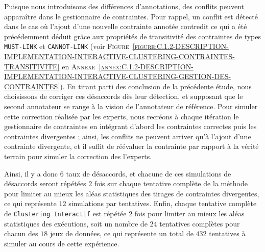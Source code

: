 			Puisque nous introduisons des différences d'annotations, des conflits peuvent apparaître dans le gestionnaire de contraintes.
			Pour rappel, un conflit est détecté dans le cas où l'ajout d'une nouvelle contrainte annotée contredit ce qui a été précédemment déduit grâce aux propriétés de transitivité des contraintes de types \texttt{MUST-LINK} et \texttt{CANNOT-LINK} (voir \textsc{Figure~\ref{figure:C.1.2-DESCRIPTION-IMPLEMENTATION-INTERACTIVE-CLUSTERING-CONTRAINTES-TRANSITIVITE}} en \textsc{Annexe~\ref{annex:C.1.2-DESCRIPTION-IMPLEMENTATION-INTERACTIVE-CLUSTERING-GESTION-DES-CONTRAINTES}}).
			En tirant parti des conclusion de la précédente étude, nous choisissons de corriger ces désaccords dès leur détection, et supposant que le second annotateur se range à la vision de l'annotateur de référence.
			Pour simuler cette correction réalisée par les experts, nous recréons à chaque itération le gestionnaire de contraintes en intégrant d'abord les contraintes correctes puis les contraintes divergentes ; ainsi, les conflits ne peuvent arriver qu'à l'ajout d'une contrainte divergente, et il suffit de réévaluer la contrainte par rapport à la vérité terrain pour simuler la correction des l'experts.
			
			Ainsi, il y a donc $6$ taux de désaccords, et chacune de ces simulations de désaccords seront répétées $2$ fois sur chaque tentative complète de la méthode pour limiter au mieux les aléas statistiques des tirages de contraintes divergentes, ce qui représente $12$ simulations par tentatives.
			Enfin, chaque tentative complète de \texttt{Clustering Interactif} est répétée $2$ fois pour limiter au mieux les aléas statistiques des exécutions, soit un nombre de $24$ tentatives complètes pour chacun des $18$ jeux de données, ce qui représente un total de $432$ tentatives à simuler au cours de cette expérience.
			
